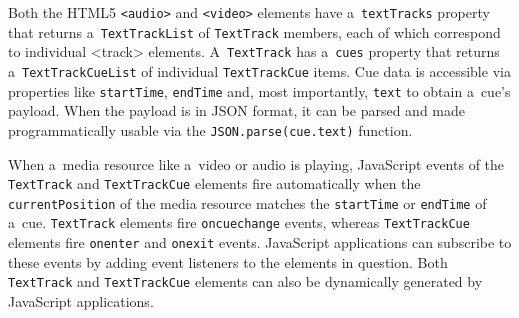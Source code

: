 \documentclass{sig-alternate}
\begin{document}
Both the HTML5 \texttt{<audio>} and \texttt{<video>} elements
have a~\texttt{textTracks} property
that returns a~\texttt{TextTrackList} of
\texttt{TextTrack} members, each of which correspond
to individual <track> elements.
A~\texttt{TextTrack} has a~\texttt{cues} property
that returns a~\texttt{TextTrackCueList} of individual
\texttt{TextTrackCue} items.
Cue data is accessible via properties like
\texttt{startTime}, \texttt{endTime} and,
most importantly, \texttt{text} to obtain a~cue's payload.
When the payload is in JSON format,
it can be parsed and made programmatically usable via the
\texttt{JSON.parse(cue.text)} function.

When a~media resource like a~video or audio is playing,
JavaScript events of the \texttt{TextTrack} and \texttt{TextTrackCue}
elements fire automatically when the \texttt{currentPosition}
of the media resource matches the
\texttt{startTime} or \texttt{endTime} of a~cue.
\texttt{TextTrack} elements fire \texttt{oncuechange} events,
whereas \texttt{TextTrackCue} elements fire
\texttt{onenter} and \texttt{onexit} events.
JavaScript applications can subscribe to these events
by adding event listeners to the elements in question.
Both \texttt{TextTrack} and \texttt{TextTrackCue} elements
can also be dynamically generated by JavaScript applications.

\end{document}
